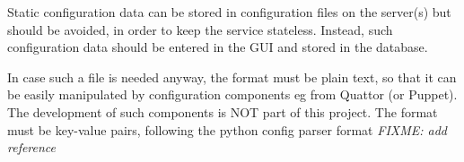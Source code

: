 Static configuration data can be stored in configuration files on the 
server(s) but should be avoided, in order to keep the service stateless. 
Instead, such configuration data should be entered in the GUI and 
stored in the database. 

In case such a file is needed anyway, the format must be plain text, 
so that it can be easily manipulated by configuration components
 eg from Quattor (or Puppet). The development of such 
components is NOT part of this project. The format must be key-value pairs, 
following the python config parser format {\it FIXME: add reference}
 
 


